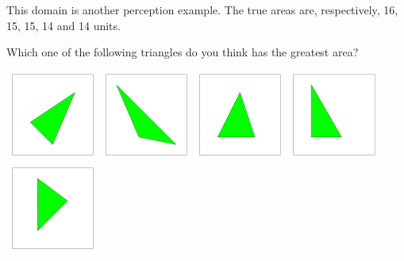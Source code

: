 
This domain is another perception example.
The true areas are, respectively, 16, 15, 15, 14 and 14 units.

\begin{tcolorbox}
	Which one of the following triangles do you think has the greatest area?

	\includegraphics[height=3cm]{Population_study_design/Triangles3.pdf}
	\includegraphics[height=3cm]{Population_study_design/Triangles1.pdf}
	\includegraphics[height=3cm]{Population_study_design/Triangles2.pdf}
	\includegraphics[height=3cm]{Population_study_design/Triangles4.pdf}
	\includegraphics[height=3cm]{Population_study_design/Triangles5.pdf}	
\end{tcolorbox}
